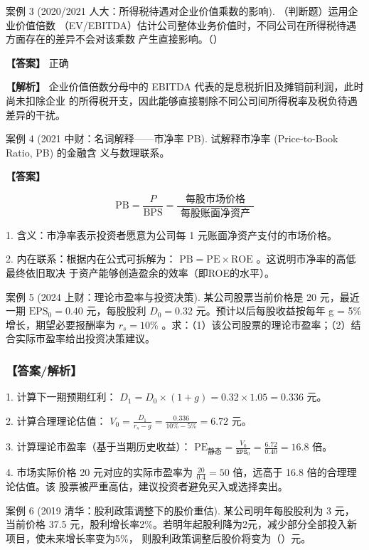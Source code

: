 \documentclass[lang=cn,10pt,color=blue]{elegantbook}
\begin{document}
案例 3 (2020/2021 人大：所得税待遇对企业价值乘数的影响). （判断题）运用企业价值倍数 （EV/EBITDA）估计公司整体业务价值时，不同公司在所得税待遇方面存在的差异不会对该乘数 产生直接影响。（） 

\textbf{\color{UnivColor} 【答案】} 正确 

\textbf{\color{UnivColor} 【解析】} 企业价值倍数分母中的 EBITDA 代表的是息税折旧及摊销前利润，此时尚未扣除企业 的所得税开支，因此能够直接剔除不同公司间所得税率及税负待遇差异的干扰。 

案例 4 (2021  中财：名词解释——市净率 PB). 试解释市净率 (Price-to-Book Ratio, PB) 的金融含 义与数理联系。 

\textbf{\color{UnivColor} 【答案】} 

$$
\mathrm{PB} = \frac {P}{\mathrm{BPS}} = \frac {\text { 每股市场价格 }}{\text { 每股账面净资产 }}
$$

1. 含义：市净率表示投资者愿意为公司每 1 元账面净资产支付的市场价格。 

2. 内在联系：根据内在公式可拆解为： $\mathrm { P B } = \mathrm { P E } \times \mathrm { R O E }$ 。这说明市净率的高低最终依旧取决 于资产能够创造盈余的效率（即ROE的水平）。 

案例 5 (2024  上财：理论市盈率与投资决策). 某公司股票当前价格是 20 元，最近一期 $\mathrm{EPS}_0 = 0.40$ 元，每股股利 $D _ { 0 } = 0 . 3 2$ 元。预计以后每股收益按每年 g = 5\% 增长，期望必要报酬率为 $r _ { s } = 1 0 \%$ 。求：（1）该公司股票的理论市盈率；（2）结合实际市盈率给出投资决策建议。 

\subsubsection{【答案/解析】}

1. 计算下一期预期红利： $D _ { 1 } = D _ { 0 } \times ( 1 + g ) = 0 . 3 2 \times 1 . 0 5 = 0 . 3 3 6$ 元。 

2. 计算合理理论估值： $\displaystyle V _ { 0 } = \frac { D _ { 1 } } { r _ { s } - g } = \frac { 0 . 3 3 6 } { 1 0 \% - 5 \% } = 6 . 7 2$ 元。 

3. 计算理论市盈率（基于当期历史收益）： $\displaystyle \text{PE}_{\text{静态}} = \frac { V _ { 0 } } { \mathtt { E P S } _ { 0 } } = \frac { 6 . 7 2 } { 0 . 4 0 } = 1 6 . 8$ 倍。 

4. 市场实际价格 20 元对应的实际市盈率为 $\frac { 2 0 } { 0 . 4 } = 5 0$ 倍，远高于 16.8 倍的合理理论估值。该 股票被严重高估，建议投资者避免买入或选择卖出。 

案例 6 (2019 清华：股利政策调整下的股价重估). 某公司明年每股股利为 3 元，当前价格 37.5 元，股利增长率2\%。若明年起股利降为2元，减少部分全部投入新项目，使未来增长率变为5\%， 则股利政策调整后股价将变为（）元。 
\end{document}
